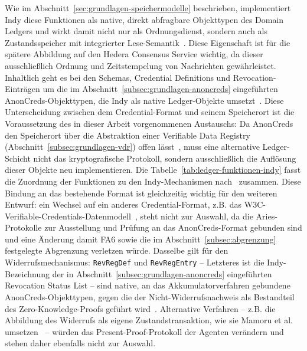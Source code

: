Wie im Abschnitt~\ref{sec:grundlagen-speichermodelle} beschrieben, implementiert Indy diese Funktionen als native, direkt abfragbare Objekttypen des Domain Ledgers und wirkt damit nicht nur als Ordnungsdienst, sondern auch als Zustandsspeicher mit integrierter Lese-Semantik~\cite{torongo2023, indynode}. Diese Eigenschaft ist für die spätere Abbildung auf den Hedera Consensus Service wichtig, da dieser ausschließlich Ordnung und Zeitstempelung von Nachrichten gewährleistet. Inhaltlich geht es bei den Schemas, Credential Definitions und Revocation-Einträgen um die im Abschnitt~\ref{subsec:grundlagen-anoncreds} eingeführten AnonCreds-Objekttypen, die Indy als native Ledger-Objekte umsetzt~\cite{anoncredsspec, torongo2023}. Diese Unterscheidung zwischen dem Credential-Format und seinem Speicherort ist die Voraussetzung des in dieser Arbeit vorgenommenen Austauschs: Da AnonCreds den Speicherort über die Abstraktion einer Verifiable Data Registry (Abschnitt~\ref{subsec:grundlagen-vdr}) offen lässt~\cite{anoncredsspec}, muss eine alternative Ledger-Schicht nicht das kryptografische Protokoll, sondern ausschließlich die Auflösung dieser Objekte neu implementieren. Die Tabelle~\ref{tab:ledger-funktionen-indy} fasst die Zuordnung der Funktionen zu den Indy-Mechanismen nach~\cite{torongo2023} zusammen. Diese Bindung an das bestehende Format ist gleichzeitig wichtig für den weiteren Entwurf: ein Wechsel auf ein anderes Credential-Format, z.B. das W3C-Verifiable-Credentials-Datenmodell~\cite{w3cvcdm}, steht nicht zur Auswahl, da die Aries-Protokolle zur Ausstellung und Prüfung an das AnonCreds-Format gebunden sind und eine Änderung damit FA6 sowie die im Abschnitt~\ref{subsec:abgrenzung} festgelegte Abgrenzung verletzen würde. Dasselbe gilt für den Widerrufsmechanismus: \texttt{RevRegDef} und \texttt{RevRegEntry} -- Letzteres ist die Indy-Bezeichnung der in Abschnitt~\ref{subsec:grundlagen-anoncreds} eingeführten Revocation Status List -- sind native, an das Akkumulatorverfahren gebundene AnonCreds-Objekttypen, gegen die der Nicht-Widerrufsnachweis als Bestandteil des Zero-Knowledge-Proofs geführt wird~\cite{anoncredsspec}. Alternative Verfahren -- z.B. die Abbildung des Widerrufs als eigene Zustandstransaktion, wie sie Mamoru et al. umsetzen~\cite{mamoru2026} -- würden das Present-Proof-Protokoll der Agenten verändern und stehen daher ebenfalls nicht zur Auswahl.


